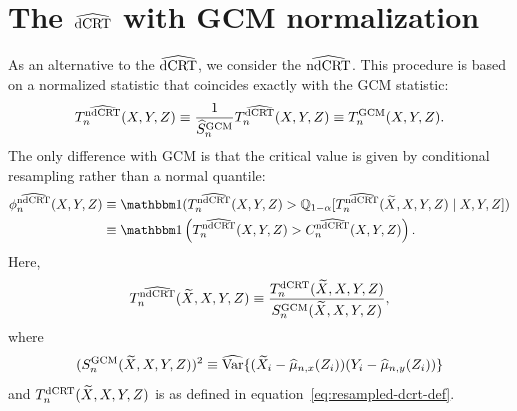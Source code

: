 \documentclass[12pt]{article}
\theoremstyle{definition}
\theoremstyle{remark}
\newcommand{\V}{\mathrm{Var}}							%
\newcommand{\Q}{\mathbb{Q}}								%
\newcommand{\indicator}{\mathbbm 1}						%
\newcommand{\srx}{X}									%
\newcommand{\srz}{Z}									%
\newcommand{\srxk}{\widetilde X}						%
\newcommand{\sry}{Y}									%
\newcommand{\dCRT}{\textnormal{dCRT}} 					%
\newcommand{\GCM}{\textnormal{GCM}}						%
\newcommand{\dCRThat}{\widehat{\textnormal{dCRT}}}		%
\newcommand{\ndCRThat}{\widehat{\textnormal{ndCRT}}}	%
\begin{document}
\printbibliography


\appendix

\section{The $\dCRThat$ with GCM normalization} \label{sec:ndcrt}

As an alternative to the $\dCRThat$, we consider the $\ndCRThat$. This procedure is based on a normalized statistic that coincides exactly with the GCM statistic:
\begin{equation*}
T^{\ndCRThat}_n(\srx,\sry,\srz) \equiv \frac{1}{\widehat S_{n}^{\GCM}}T_n^{\dCRThat}(\srx, \sry, \srz) \equiv T^{\GCM}_n(\srx, \sry, \srz).
\end{equation*}
The only difference with GCM is that the critical value is given by conditional resampling rather than a normal quantile:
\begin{equation}
	\begin{split}
		\phi^{\ndCRThat}_n(\srx, \sry, \srz) &\equiv \indicator(T_n^{\ndCRThat}(\srx, \sry, \srz) > \Q_{1-\alpha}[T_n^{\ndCRThat}(\srxk, \srx, \sry, \srz) \mid \srx, \sry, \srz]) \\
		&\equiv \indicator\left(T_n^{\ndCRThat}(\srx, \sry, \srz) > C^{\ndCRThat}_n(\srx, \sry, \srz)\right).
	\end{split}
\end{equation}
Here, 
\begin{equation*}
T_n^{\ndCRThat}(\srxk, \srx, \sry, \srz) \equiv \frac{T_n^{\dCRT}(\srxk, \srx, \sry, \srz)}{S_n^{\GCM}(\srxk, \srx, \sry, \srz)},
\end{equation*}
where 
\begin{equation*}
(S_n^{\GCM}(\srxk, \srx, \sry, \srz))^2 \equiv \widehat{\V}\{(\srxk_i - \widehat \mu_{n,x}(\srz_i))(\sry_i - \widehat \mu_{n,y}(\srz_i))\}
\end{equation*}
and $T_n^{\dCRT}(\srxk, \srx, \sry, \srz)$ is as defined in equation~\eqref{eq:resampled-dcrt-def}.
\end{document}
